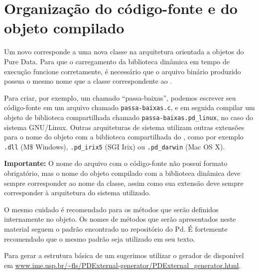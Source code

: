 
\section{Organização do código-fonte e do objeto compilado}
\label{sec:organizacao}

Um novo \external corresponde a uma nova classe na arquitetura orientada a
objetos do Pure Data. Para que o carregamento da biblioteca dinâmica
em tempo de execução funcione corretamente, é necessário que o
arquivo binário produzido possua o mesmo nome que a classe correspondente ao
\external.

Para criar, por exemplo, um \external chamado ``passa-baixas'', podemos
escrever seu código-fonte em um arquivo chamado \texttt{passa-baixas.c}, e em
seguida compilar um objeto de biblioteca compartilhada chamado
\texttt{passa-baixas.pd\_linux}, no caso do sistema GNU/Linux.
Outras arquiteturas de sistema utilizam outras extensões para o nome do objeto com a
biblioteca compartilhada do \external, como por exemplo \texttt{.dll} (M\$
Windows), \texttt{.pd\_irix5} (SGI Irix) ou \texttt{.pd\_darwin} (Mac OS X).

\textbf{Importante:} O nome do arquivo com o código-fonte não possui formato
obrigatório, mas o nome do objeto compilado com a biblioteca dinâmica deve
sempre corresponder ao nome da classe, assim como sua extensão deve sempre
corresponder à arquitetura do sistema utilizado.

O mesmo cuidado é recomendado para os métodos que serão definidos internamente
no objeto. Os nomes de métodos que serão apresentados neste material seguem o padrão
encontrado no repositório do Pd.
É fortemente recomendado que o mesmo padrão seja
utilizado em seu texto.

Para gerar a estrutura básica de um \external sugerimos utilizar o gerador de
\external disponível em \url{www.ime.usp.br/~fls/PDExternal-generator/PDExternal_generator.html}.

